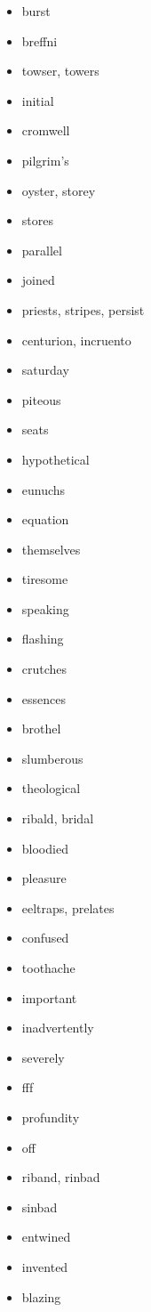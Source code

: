 \documentclass{article}
\begin{document}
\begin{itemize}
    \item burst
    \item breffni
    \item towser, towers
    \item initial
    \item cromwell
    \item pilgrim's
    \item oyster, storey
    \item stores
    \item parallel
    \item joined
    \item priests, stripes, persist
    \item centurion, incruento
    \item saturday
    \item piteous
    \item seats
    \item hypothetical
    \item eunuchs
    \item equation
    \item themselves
    \item tiresome
    \item speaking
    \item flashing
    \item crutches
    \item essences
    \item brothel
    \item slumberous
    \item theological
    \item ribald, bridal
    \item bloodied
    \item pleasure
    \item eeltraps, prelates
    \item confused
    \item toothache
    \item important
    \item inadvertently
    \item severely
    \item fff
    \item profundity
    \item off
    \item riband, rinbad
    \item sinbad
    \item entwined
    \item invented
    \item blazing

\end{itemize}
\end{document}
